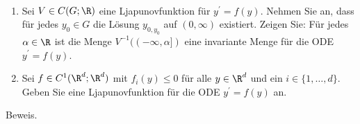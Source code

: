 \begin{exercise}
\leavevmode \\
\begin{enumerate}[label = \textbf{\alph*)}]
  \item Sei $V \in C(G;\R)$ eine Ljapunovfunktion für $y^{\prime} = f(y)$. Nehmen Sie
  an, dass für jedes $y_0 \in G$ die Lösung $y_{0,y_0}$ auf $(0,\infty)$ existiert.
  Zeigen Sie: Für jedes $\alpha \in \R$ ist die Menge $V^{-1}((-\infty,\alpha])$
  eine invariante Menge für die ODE $y^{\prime} = f(y)$.
  \item Sei $f \in C^1(\R^d;\R^d)$ mit $f_i(y) \leq 0$ für alle $y \in \R^d$
  und ein $i \in \{1,\dots,d\}$. Geben Sie eine Ljapunovfunktion für die ODE
  $y^{\prime} = f(y)$ an.
\end{enumerate}
\end{exercise}
\begin{solution}
Beweis.
\end{solution}
